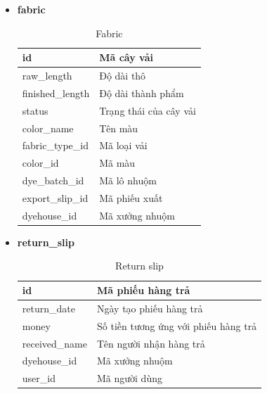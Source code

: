 \begin{itemize}
    \newpage
    \item \textbf{fabric}
    \begin{table}[H]
        \centering
        \begin{tabular}{|m{3cm}|m{10cm}|}
        \hline 
            id & Mã cây vải\\ \hline
            raw\_length & Độ dài thô\\ \hline
            finished\_length & Độ dài thành phẩm \\ \hline
            status & Trạng thái của cây vải\\ \hline
            color\_name & Tên màu\\ \hline
            fabric\_type\_id & Mã loại vải\\ \hline
            color\_id & Mã màu \\ \hline
            dye\_batch\_id & Mã lô nhuộm\\ \hline
            export\_slip\_id & Mã phiếu xuất\\ \hline
            dyehouse\_id & Mã xưởng nhuộm\\ 
        \hline 
        \end{tabular}
        \caption{Fabric}
        \label{fabric}
    \end{table}

    \item \textbf{return\_slip}
    \begin{table}[H]
        \centering
        \begin{tabular}{|m{3cm}|m{10cm}|}
        \hline 
            id & Mã phiếu hàng trả\\ \hline
            return\_date & Ngày tạo phiếu hàng trả\\ \hline
            money & Số tiền tương ứng với phiếu hàng trả \\ \hline
            received\_name & Tên người nhận hàng trả\\ \hline
            dyehouse\_id & Mã xưởng nhuộm\\ \hline
            user\_id & Mã người dùng\\ 
        \hline 
        \end{tabular}
        \caption{Return slip}
        \label{return_slip}
    \end{table}
    

\end{itemize}
